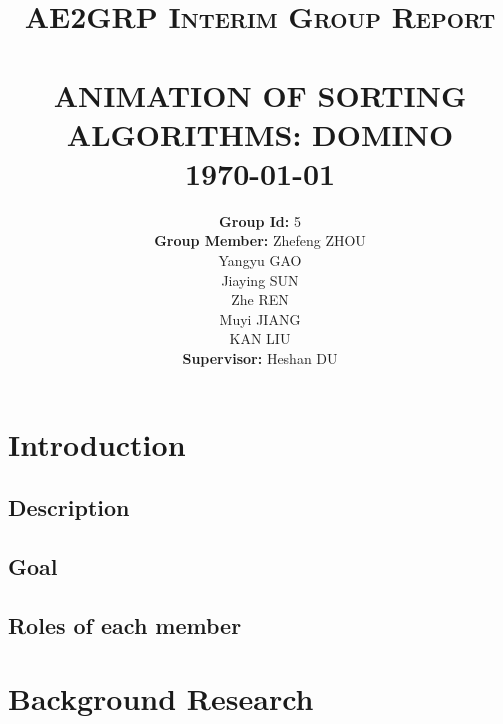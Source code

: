 \documentclass[paper=a4, fontsize=11pt,twoside]{scrartcl}		%
\title{	\normalsize \textsc{AE2GRP Interim Group Report} 	%
		 	\\[2.0cm]													%
			\HRule{0.5pt} \\										%
			\LARGE \textbf{\uppercase{Animation of Sorting Algorithms: Domino}}	%
			\HRule{2pt} \\ [0.5cm]								%
			\normalsize \today									%
		}
\author{
		\textbf{Group Id:} 5\\	
		 \textbf{Group Member: } Zhefeng ZHOU\\  Yangyu GAO\\  Jiaying SUN\\ Zhe REN\\  Muyi JIANG\\  KAN LIU\\
		\textbf{Supervisor: } Heshan DU\\	
        }
\makeatletter
\def\printtitle{%
    {\centering \@title\par}}
\def\printauthor{%
    {\centering \large \@author}}
\makeatother
\begin{document}
\thispagestyle{empty}				%
\printtitle									%
  	\vfill
\printauthor								%
\cleardoublepage

\newpage
\tableofcontents
\thispagestyle{empty}	
\newpage
\cleardoublepage


\setcounter{page}{1}

\section{Introduction}
\subsection{Description}
\subsection{Goal}
\subsection{Roles of each member }


\section{Background Research}
\end{document}
